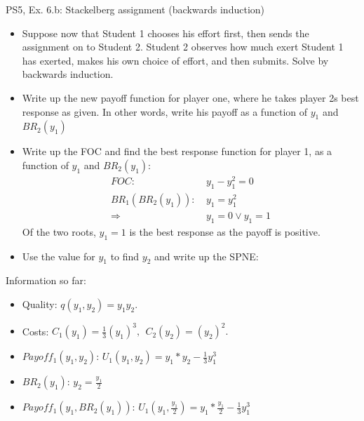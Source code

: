 \begin{frame}{PS5, Ex. 6.b: Stackelberg assignment (backwards induction)}
    \begin{itemize}
    \item[(b)] Suppose now that Student 1 chooses his effort first, then sends the assignment on to Student 2. Student 2 observes how much exert Student 1 has exerted, makes his own choice of effort, and then submits. Solve by backwards induction.
    \end{itemize}
    \vfill\null
  \begin{multicols}{2}
    \begin{itemize}
      \item[(Step 1)] Write up the new payoff function for player one, where he takes player 2s best response as given. In other words, write his payoff as a function of \begin{math}y_1\end{math} and \begin{math}BR_2(y_1)\end{math}
      \item[(Step 2)] Write up the FOC and find the best response function for player 1, as a function of \begin{math}y_1\end{math} and \begin{math}BR_2(y_1)\end{math}:
      \begin{align*}
          FOC:            &\ y_1 - y_1^2 = 0\\
          BR_1(BR_2(y_1)):&\ y_1 = y_1^2\\
              \Rightarrow &\ y_1=0\vee y_1=1
      \end{align*}
      Of the two roots, $y_1=1$ is the best response as the payoff is positive.
      \item[(Step 3)] Use the value for $y_1$ to find $y_2$ and write up the SPNE:
    \end{itemize}
    \vfill\null \columnbreak
    Information so far:
    \begin{itemize}
        \item[1] Quality: $q(y_1, y_2) = y_1y_2.$\\
        \item[2] Costs: $C_1(y_1) = \frac{1}{3}(y_1)^3,\ \ C_2(y_2) = (y_2)^2.$\\
        \item[3] $Payoff_1(y_1,y_2)$: $U_1(y_1,y_2) = y_1*y_2-\frac{1}{3}y_1^3$ \\
        \item[4] $BR_2(y_1)$: $y_2 = \frac{y_1}{2}$ \\
        \item[5] $Payoff_1(y_1,BR_2(y_1))$: $U_1(y_1,\frac{y_1}{2}) = y_1*\frac{y_1}{2}-\frac{1}{3}y_1^3$ \\
    \end{itemize}
    \vfill\null
  \end{multicols}
\end{frame}

